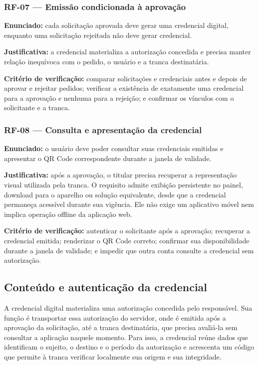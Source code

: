 \subsubsection*{RF-07 --- Emissão condicionada à aprovação}

\textbf{Enunciado:} cada solicitação aprovada deve gerar uma credencial digital, enquanto uma solicitação rejeitada não deve gerar credencial.

\textbf{Justificativa:} a credencial materializa a autorização concedida e precisa manter relação inequívoca com o pedido, o usuário e a tranca destinatária.

\textbf{Critério de verificação:} comparar solicitações e credenciais antes e depois de aprovar e rejeitar pedidos; verificar a existência de exatamente uma credencial para a aprovação e nenhuma para a rejeição; e confirmar os vínculos com o solicitante e a tranca.

\subsubsection*{RF-08 --- Consulta e apresentação da credencial}

\textbf{Enunciado:} o usuário deve poder consultar suas credenciais emitidas e apresentar o QR Code correspondente durante a janela de validade.

\textbf{Justificativa:} após a aprovação, o titular precisa recuperar a representação visual utilizada pela tranca. O requisito admite exibição persistente no painel, download para o aparelho ou solução equivalente, desde que a credencial permaneça acessível durante sua vigência. Ele não exige um aplicativo móvel nem implica operação offline da aplicação web.

\textbf{Critério de verificação:} autenticar o solicitante após a aprovação; recuperar a credencial emitida; renderizar o QR Code correto; confirmar sua disponibilidade durante a janela de validade; e impedir que outra conta consulte a credencial sem autorização.

\subsection{Conteúdo e autenticação da credencial}

A credencial digital materializa uma autorização concedida pelo responsável. Sua função é transportar essa autorização do servidor, onde é emitida após a aprovação da solicitação, até a tranca destinatária, que precisa avaliá-la sem consultar a aplicação naquele momento. Para isso, a credencial reúne dados que identificam o sujeito, o destino e o período da autorização e acrescenta um código que permite à tranca verificar localmente sua origem e sua integridade.

